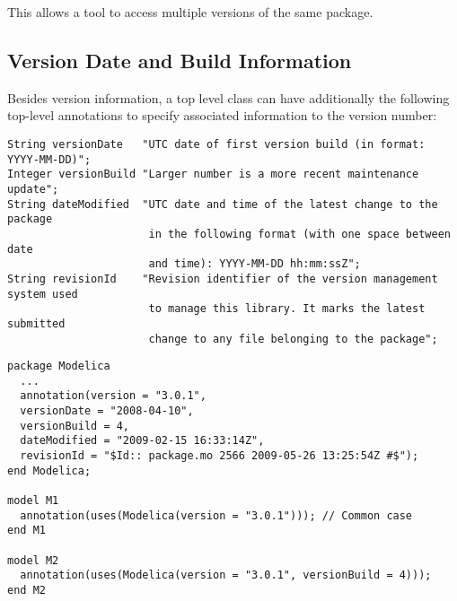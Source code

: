 This allows a tool to access multiple versions of the same package.

\subsection{Version Date and Build Information}\label{version-date-and-build-information}

Besides version information, a top level class can have additionally the
following top-level annotations to specify associated information to the
version number:
\begin{lstlisting}[language=modelica]
String versionDate   "UTC date of first version build (in format: YYYY-MM-DD)";
Integer versionBuild "Larger number is a more recent maintenance update";
String dateModified  "UTC date and time of the latest change to the package
                      in the following format (with one space between date
                      and time): YYYY-MM-DD hh:mm:ssZ";
String revisionId    "Revision identifier of the version management system used
                      to manage this library. It marks the latest submitted
                      change to any file belonging to the package";
\end{lstlisting}

\begin{example}
\begin{lstlisting}[language=modelica,mathescape=false]
package Modelica
  ...
  annotation(version = "3.0.1",
  versionDate = "2008-04-10",
  versionBuild = 4,
  dateModified = "2009-02-15 16:33:14Z",
  revisionId = "$Id:: package.mo 2566 2009-05-26 13:25:54Z #$");
end Modelica;

model M1
  annotation(uses(Modelica(version = "3.0.1"))); // Common case
end M1

model M2
  annotation(uses(Modelica(version = "3.0.1", versionBuild = 4)));
end M2
\end{lstlisting}
\end{example}

